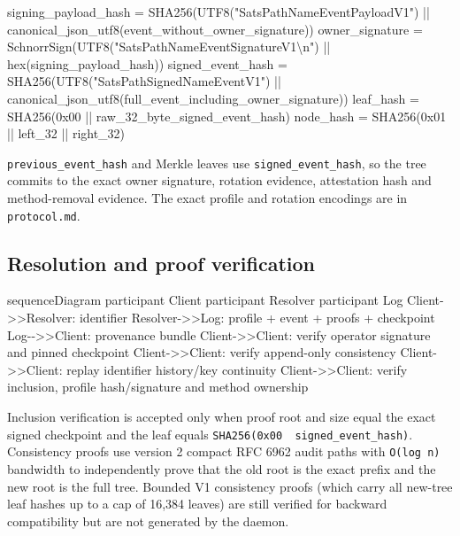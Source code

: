\documentclass[
]{article}
\newenvironment{Shaded}{}{}
\newcommand{\NormalTok}[1]{#1}
\begin{document}
\begin{Shaded}
\begin{Highlighting}[]
\NormalTok{signing\_payload\_hash = SHA256(UTF8("SatsPathNameEventPayloadV1") || canonical\_json\_utf8(event\_without\_owner\_signature))}
\NormalTok{owner\_signature      = SchnorrSign(UTF8("SatsPathNameEventSignatureV1\textbackslash{}n") || hex(signing\_payload\_hash))}
\NormalTok{signed\_event\_hash    = SHA256(UTF8("SatsPathSignedNameEventV1") || canonical\_json\_utf8(full\_event\_including\_owner\_signature))}
\NormalTok{leaf\_hash            = SHA256(0x00 || raw\_32\_byte\_signed\_event\_hash)}
\NormalTok{node\_hash  = SHA256(0x01 || left\_32 || right\_32)}
\end{Highlighting}
\end{Shaded}

\texttt{previous\_event\_hash} and Merkle leaves use
\texttt{signed\_event\_hash}, so the tree commits to the exact owner
signature, rotation evidence, attestation hash and method-removal
evidence. The exact profile and rotation encodings are in
\texttt{protocol.md}.

\hypertarget{resolution-and-proof-verification}{%
\subsection{Resolution and proof
verification}\label{resolution-and-proof-verification}}

\begin{Shaded}
\begin{Highlighting}[]
\NormalTok{sequenceDiagram}
\NormalTok{  participant Client}
\NormalTok{  participant Resolver}
\NormalTok{  participant Log}
\NormalTok{  Client{-}\textgreater{}\textgreater{}Resolver: identifier}
\NormalTok{  Resolver{-}\textgreater{}\textgreater{}Log: profile + event + proofs + checkpoint}
\NormalTok{  Log{-}{-}\textgreater{}\textgreater{}Client: provenance bundle}
\NormalTok{  Client{-}\textgreater{}\textgreater{}Client: verify operator signature and pinned checkpoint}
\NormalTok{  Client{-}\textgreater{}\textgreater{}Client: verify append{-}only consistency}
\NormalTok{  Client{-}\textgreater{}\textgreater{}Client: replay identifier history/key continuity}
\NormalTok{  Client{-}\textgreater{}\textgreater{}Client: verify inclusion, profile hash/signature and method ownership}
\end{Highlighting}
\end{Shaded}

Inclusion verification is accepted only when proof root and size equal
the exact signed checkpoint and the leaf equals
\texttt{SHA256(0x00\ \textbar{}\textbar{}\ signed\_event\_hash)}.
Consistency proofs use version 2 compact RFC 6962 audit paths with
\texttt{O(log\ n)} bandwidth to independently prove that the old root is
the exact prefix and the new root is the full tree. Bounded V1
consistency proofs (which carry all new-tree leaf hashes up to a cap of
16,384 leaves) are still verified for backward compatibility but are not
generated by the daemon.
\end{document}
